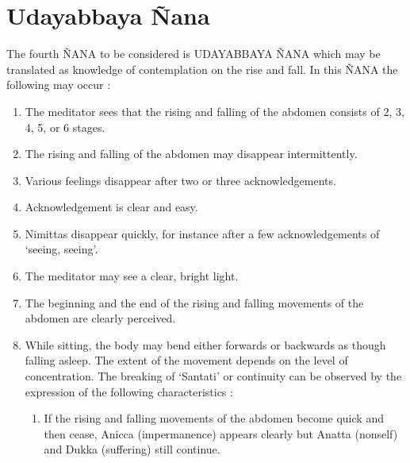 \documentclass[a5paper,10pt,english]{book}
\begin{document}
\sphinxAtStartPar
{}


\section{Udayabbaya Ñana}
\label{\detokenize{progress:udayabbaya-nana}}
\sphinxAtStartPar
The fourth ÑANA to be considered is UDAYABBAYA ÑANA which may be translated as knowledge of contemplation on the rise and fall. In this ÑANA the following may occur :\sphinxhyphen{}
\begin{enumerate}
%
\item {} 
\sphinxAtStartPar
The meditator sees that the rising and falling of the abdomen consists of 2, 3, 4, 5, or 6 stages.

\item {} 
\sphinxAtStartPar
The rising and falling of the abdomen may disappear intermittently.

\item {} 
\sphinxAtStartPar
Various feelings disappear after two or three acknowledgements.

\item {} 
\sphinxAtStartPar
Acknowledgement is clear and easy.

\item {} 
\sphinxAtStartPar
Nimittas disappear quickly, for instance after a   few acknowledgements of ‘seeing, seeing’.

\item {} 
\sphinxAtStartPar
The meditator may see a clear, bright light.

\item {} 
\sphinxAtStartPar
The beginning and the end of the rising and falling movements of the abdomen are clearly perceived.

\item {} 
\sphinxAtStartPar
While sitting, the body may bend either forwards or backwards as though falling asleep. The extent of the movement depends on the level of concentration. The breaking of ‘Santati’ or continuity can be observed by the expression of the following characteristics :
\begin{enumerate}
%
\item {} 
\sphinxAtStartPar
If the rising and falling movements of the abdomen become quick and then cease, Anicca (impermanence) appears clearly but Anatta (non\sphinxhyphen{}self) and Dukka (suffering) still continue.


\end{enumerate}
\end{enumerate}
\end{document}
